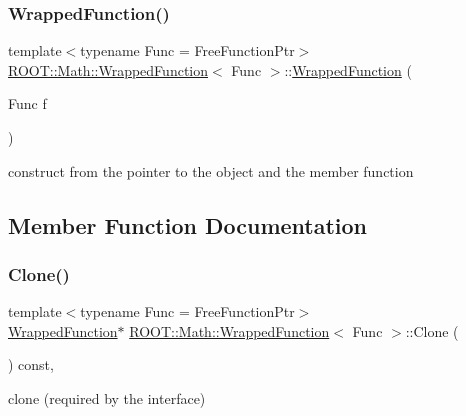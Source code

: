 \subsubsection{\texorpdfstring{WrappedFunction()}{WrappedFunction()}\hspace{0.1cm}{\footnotesize\ttfamily [3/3]}}
{\footnotesize\ttfamily template$<$typename Func  = Free\+Function\+Ptr$>$ \\
\mbox{\hyperlink{classROOT_1_1Math_1_1WrappedFunction}{R\+O\+O\+T\+::\+Math\+::\+Wrapped\+Function}}$<$ Func $>$\+::\mbox{\hyperlink{classROOT_1_1Math_1_1WrappedFunction}{Wrapped\+Function}} (\begin{DoxyParamCaption}\item[{Func}]{f }\end{DoxyParamCaption})\hspace{0.3cm}{\ttfamily [inline]}}

construct from the pointer to the object and the member function 

\subsection{Member Function Documentation}
\mbox{\label{classROOT_1_1Math_1_1WrappedFunction_a4ec89f0c717b0fc228ebe7d71e14b1ee}} 
\subsubsection{\texorpdfstring{Clone()}{Clone()}\hspace{0.1cm}{\footnotesize\ttfamily [1/3]}}
{\footnotesize\ttfamily template$<$typename Func  = Free\+Function\+Ptr$>$ \\
\mbox{\hyperlink{classROOT_1_1Math_1_1WrappedFunction}{Wrapped\+Function}}$\ast$ \mbox{\hyperlink{classROOT_1_1Math_1_1WrappedFunction}{R\+O\+O\+T\+::\+Math\+::\+Wrapped\+Function}}$<$ Func $>$\+::Clone (\begin{DoxyParamCaption}{ }\end{DoxyParamCaption}) const\hspace{0.3cm}{\ttfamily [inline]}, {\ttfamily [virtual]}}



clone (required by the interface) 



